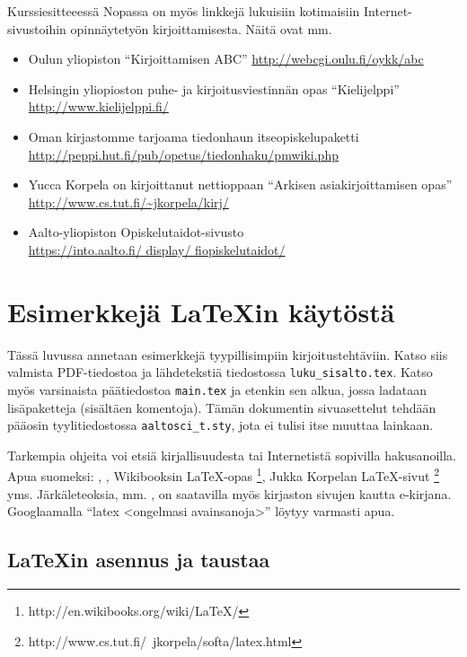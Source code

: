 Kurssiesitteeessä Nopassa on myös linkkejä lukuisiin 
kotimaisiin Internet-sivustoihin opinnäytetyön kirjoittamisesta.
Näitä ovat mm.
%
\begin{itemize}
\item Oulun yliopiston ``Kirjoittamisen ABC''
  \url{http://webcgi.oulu.fi/oykk/abc}
%
\item Helsingin yliopioston puhe- ja kirjoitusviestinnän opas
  ``Kielijelppi'' \url{http://www.kielijelppi.fi/}
%
\item Oman kirjastomme tarjoama tiedonhaun itseopiskelupaketti
  \url{http://peppi.hut.fi/pub/opetus/tiedonhaku/pmwiki.php}
%
\item Yucca Korpela on kirjoittanut nettioppaan ``Arkisen
  asiakirjoittamisen opas'' \url{http://www.cs.tut.fi/~jkorpela/kirj/}
\item Aalto-yliopiston Opiskelutaidot-sivusto \\
  \url{https://into.aalto.fi/ display/ fiopiskelutaidot/}
%
\end{itemize}



\section{Esimerkkejä \LaTeX{}in käytöstä}
\label{sec:esimluku}

Tässä luvussa annetaan esimerkkejä tyypillisimpiin
kirjoitustehtäviin. Katso siis valmista PDF-tiedostoa ja lähdetekstiä
tiedostossa \verb!luku_sisalto.tex!. Katso myös varsinaista
päätiedostoa \verb!main.tex! ja etenkin sen alkua, jossa ladataan
lisäpaketteja (sisältäen komentoja). Tämän dokumentin sivuasettelut
tehdään pääosin tyylitiedostossa \verb!aaltosci_t.sty!, jota ei tulisi
itse muuttaa lainkaan.

Tarkempia ohjeita voi etsiä kirjallisuudesta tai Internetistä
sopivilla hakusanoilla. Apua suomeksi: \citet{lyhyt2e},
\citet{mattakivela}, Wikibooksin LaTeX-opas%
\footnote{http://en.wikibooks.org/wiki/LaTeX/}, Jukka Korpelan
LaTeX-sivut%
\footnote{http://www.cs.tut.fi/~jkorpela/softa/latex.html} yms.
Järkäleteoksia, mm.  \citet{mittelbach2004}, on saatavilla myös
kirjaston sivujen kautta e-kirjana. Googlaamalla ``latex <ongelmasi
avainsanoja>'' löytyy varmasti apua.

\subsection{\LaTeX{}in asennus ja taustaa}
\label{sec:esimlatexajo}

